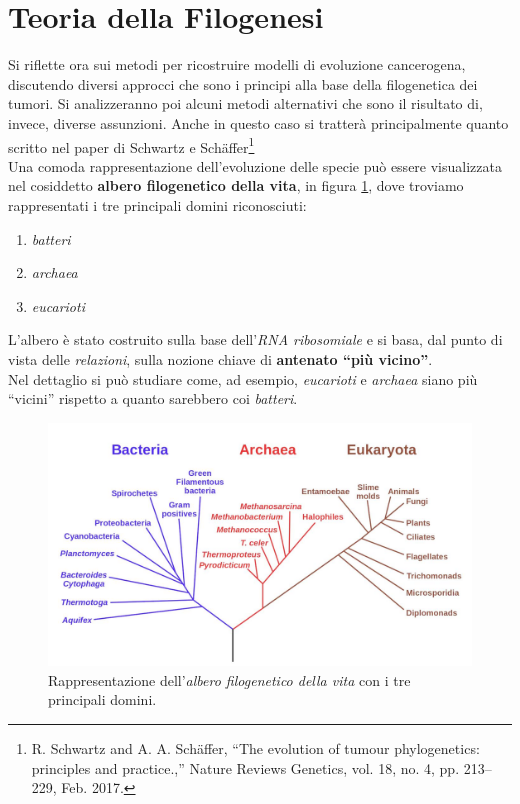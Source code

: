 \documentclass[a4paper,12pt, oneside]{book}
\begin{document}
\section{Teoria della Filogenesi}
Si riflette ora sui metodi per ricostruire modelli di evoluzione cancerogena,
discutendo diversi approcci che sono i principi alla base della filogenetica dei
tumori. Si analizzeranno poi alcuni metodi alternativi che sono il risultato di,
invece, diverse assunzioni. Anche in questo caso si tratterà principalmente
quanto scritto nel paper di Schwartz e Schäffer\footnote{R. Schwartz and
  A. A. Schäffer, “The evolution of tumour 
  phylogenetics: principles and practice.,” Nature Reviews
  Genetics, vol. 18, no. 4, pp. 213–229, Feb. 2017.} \\
Una comoda rappresentazione dell'evoluzione delle specie può essere visualizzata
nel cosiddetto \textbf{albero filogenetico della vita}, in figura
\ref{fig:phylo}, dove troviamo rappresentati i tre principali domini
riconosciuti: 
\begin{enumerate}
  \item \textit{batteri}
  \item \textit{archaea}
  \item \textit{eucarioti}
\end{enumerate}
L'albero è stato costruito sulla base dell'\textit{RNA ribosomiale} e si basa,
dal punto di vista delle \textit{relazioni}, sulla nozione chiave di
\textbf{antenato ``più vicino''}.\\
Nel dettaglio si può studiare come, ad esempio, \textit{eucarioti} e
\textit{archaea} siano più ``vicini'' rispetto a quanto sarebbero coi
\textit{batteri}. 
\begin{figure}
  \centering
  \includegraphics[scale = 0.23]{img/phylo.jpg}
  \caption{Rappresentazione dell'\textit{albero filogenetico della vita} con i
    tre principali domini.}
  \label{fig:phylo}
\end{figure}
\end{document}
